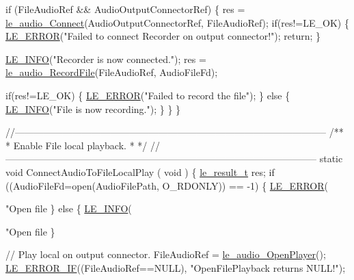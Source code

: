 \begin{DoxyCodeInclude}
{{{{{    \textcolor{keywordflow}{if} (FileAudioRef && AudioOutputConnectorRef)
    \{
        res = \hyperlink{le__audio__interface_8h_a338df65b2fb1ae0140d86880adbcf0de}{le\_audio\_Connect}(AudioOutputConnectorRef, FileAudioRef);
        \textcolor{keywordflow}{if}(res!=LE\_OK)
        \{
            \hyperlink{le__log_8h_a353590f91b3143a7ba3a416ae5a50c3d}{LE\_ERROR}(\textcolor{stringliteral}{"Failed to connect Recorder on output connector!"});
            \textcolor{keywordflow}{return};
        \}

        \hyperlink{le__log_8h_a23e6d206faa64f612045d688cdde5808}{LE\_INFO}(\textcolor{stringliteral}{"Recorder is now connected."});
        res = \hyperlink{le__audio__interface_8h_a393a26f6cff7fe05c1813fcafeef50f3}{le\_audio\_RecordFile}(FileAudioRef, AudioFileFd);

        \textcolor{keywordflow}{if}(res!=LE\_OK)
        \{
            \hyperlink{le__log_8h_a353590f91b3143a7ba3a416ae5a50c3d}{LE\_ERROR}(\textcolor{stringliteral}{"Failed to record the file"});
        \}
        \textcolor{keywordflow}{else}
        \{
            \hyperlink{le__log_8h_a23e6d206faa64f612045d688cdde5808}{LE\_INFO}(\textcolor{stringliteral}{"File is now recording."});
        \}
    \}
\}

\textcolor{comment}{//--------------------------------------------------------------------------------------------------}\textcolor{comment}{}
\textcolor{comment}{/**}
\textcolor{comment}{ * Enable File local playback.}
\textcolor{comment}{ *}
\textcolor{comment}{ */}
\textcolor{comment}{//--------------------------------------------------------------------------------------------------}
\textcolor{keyword}{static} \textcolor{keywordtype}{void} ConnectAudioToFileLocalPlay
(
    \textcolor{keywordtype}{void}
)
\{
    \hyperlink{le__basics_8h_a1cca095ed6ebab24b57a636382a6c86c}{le\_result\_t} res;
    \textcolor{keywordflow}{if} ((AudioFileFd=open(AudioFilePath, O\_RDONLY)) == -1)
    \{
        \hyperlink{le__log_8h_a353590f91b3143a7ba3a416ae5a50c3d}{LE\_ERROR}(\textcolor{stringliteral}{"Open file %
    \}
    \textcolor{keywordflow}{else}
    \{
        \hyperlink{le__log_8h_a23e6d206faa64f612045d688cdde5808}{LE\_INFO}(\textcolor{stringliteral}{"Open file %
    \}

    \textcolor{comment}{// Play local on output connector.}
    FileAudioRef = \hyperlink{le__audio__interface_8h_a92eb1b6377f50ff07b97c5b8546f01ec}{le\_audio\_OpenPlayer}();
    \hyperlink{le__log_8h_aceaf11a11691d6c676e36dd317b38dbd}{LE\_ERROR\_IF}((FileAudioRef==NULL), \textcolor{stringliteral}{"OpenFilePlayback returns NULL!"});

}}}}}}}
\end{DoxyCodeInclude}
